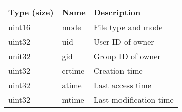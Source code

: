 \documentclass[]{article}
\begin{document}
	\begin{tabular}{|l|l|l|} 
		\hline
		\textbf{Type (size)} & \textbf{Name} & \textbf{Description} \\ [0.5ex] 
		\hline
		uint16 & mode & File type and mode \\
		\hline
		uint32 & uid & User ID of owner \\
		\hline
		unit32 & gid & Group ID of owner \\
		\hline
		uint32 & crtime & Creation time \\
		\hline
		uint32 & atime & Last access time \\
		\hline
		uint32 & mtime & Last modification time \\
		\hline
	\end{tabular}
\end{document}
